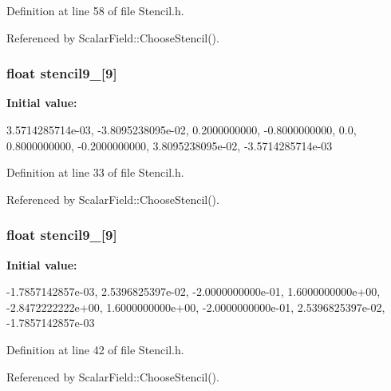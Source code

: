 Definition at line 58 of file Stencil.h.



Referenced by ScalarField::ChooseStencil().

\subsubsection[{stencil9\_\-1}]{\setlength{\rightskip}{0pt plus 5cm}float {\bf stencil9\_}\mbox{[}9\mbox{]}}\label{Stencil_8h_a2755a49f4437eff2716aaeabc24c8ded}
{\bfseries Initial value:}
\begin{DoxyCode}
 { 3.5714285714e-03,
                -3.8095238095e-02,
                0.2000000000,
                -0.8000000000,
                0.0,
                0.8000000000,
                -0.2000000000,
                3.8095238095e-02,
                -3.5714285714e-03 }
\end{DoxyCode}


Definition at line 33 of file Stencil.h.



Referenced by ScalarField::ChooseStencil().

\subsubsection[{stencil9\_\-2}]{\setlength{\rightskip}{0pt plus 5cm}float {\bf stencil9\_}\mbox{[}9\mbox{]}}\label{Stencil_8h_a6851d45b9f10e2ea51a79c6e3f7bc640}
{\bfseries Initial value:}
\begin{DoxyCode}
 { -1.7857142857e-03,
                2.5396825397e-02,
                -2.0000000000e-01,
                1.6000000000e+00,
                -2.8472222222e+00,
                1.6000000000e+00,
                -2.0000000000e-01,
                2.5396825397e-02,
                -1.7857142857e-03 }
\end{DoxyCode}


Definition at line 42 of file Stencil.h.



Referenced by ScalarField::ChooseStencil().

